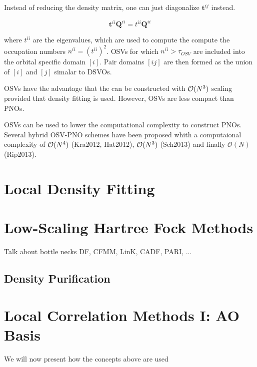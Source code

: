 Instead of reducing the density matrix, one can just diagonalize $\mathbf{t}^{ij}$ instead. 

\begin{equation}
\mathbf{t}^{ii} \mathbf{Q}^{ii} = t^{ii} \mathbf{Q}^{ii}
\end{equation}

\noindent where $t^{ii}$ are the eigenvalues, which are used to compute the compute the occupation numbers $n^{ii} = \left( t^{ii} \right)^2$. OSVs for which $n^{ii} > \tau_{OSV}$ are included into the orbital specific domain $[i]$. Pair domains $[ij]$ are then formed as the union of $[i]$ and $[j]$ simalar to DSVOs. 

OSVs have the advantage that the can be constructed with $\mathcal{O}(N^{3})$ scaling provided that density fitting is used. However, OSVs are less compact than PNOs.

OSVs can be used to lower the computational complexity to construct PNOs. Several hybrid OSV-PNO schemes have been proposed whith a computaional complexity of $\mathcal{O}(N^{4})$ (Kra2012, Hat2012), $\mathcal{O}(N^{3})$ (Sch2013) and finally $\mathcal{O}(N)$ (Rip2013).


\section{Local Density Fitting}


\section{Low-Scaling Hartree Fock Methods}

Talk about bottle necks
DF, CFMM, LinK, CADF, PARI, ...

\subsection{Density Purification}

\section{Local Correlation Methods I: AO Basis}

We will now present how the concepts above are used 

